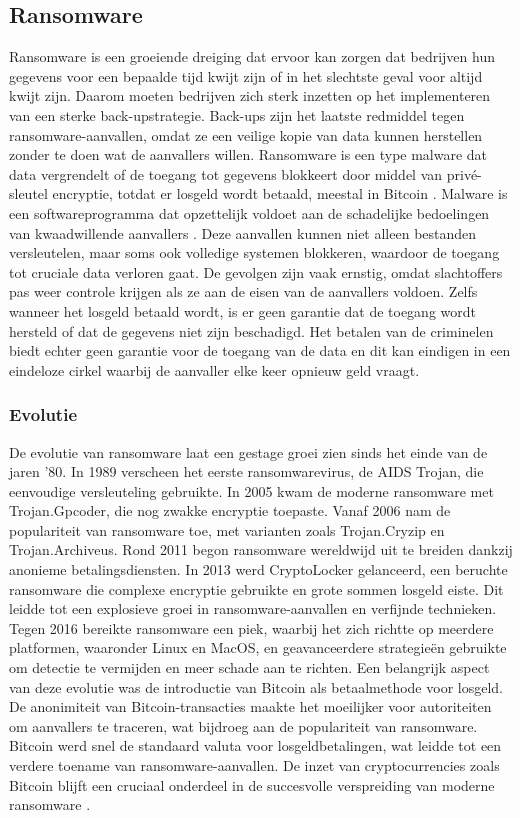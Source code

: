 \subsection{Ransomware}
Ransomware is een groeiende dreiging dat ervoor kan zorgen dat bedrijven hun gegevens voor een bepaalde tijd kwijt zijn of in het slechtste geval voor altijd kwijt zijn. Daarom moeten bedrijven zich sterk inzetten op het implementeren van een sterke back-upstrategie. Back-ups zijn het laatste redmiddel tegen ransomware-aanvallen, omdat ze een veilige kopie van data kunnen herstellen zonder te doen wat de aanvallers willen. Ransomware is een type malware dat data vergrendelt of de toegang tot gegevens blokkeert door middel van privé-sleutel encryptie, totdat er losgeld wordt betaald, meestal in Bitcoin \autocite{Richardson2017}. Malware is een softwareprogramma dat opzettelijk voldoet aan de schadelijke bedoelingen van kwaadwillende aanvallers \autocite{Yanfang2017}. Deze aanvallen kunnen niet alleen bestanden versleutelen, maar soms ook volledige systemen blokkeren, waardoor de toegang tot cruciale data verloren gaat. De gevolgen zijn vaak ernstig, omdat slachtoffers pas weer controle krijgen als ze aan de eisen van de aanvallers voldoen. Zelfs wanneer het losgeld betaald wordt, is er geen garantie dat de toegang wordt hersteld of dat de gegevens niet zijn beschadigd. Het betalen van de criminelen biedt echter geen garantie voor de toegang van de data en dit kan eindigen in een eindeloze cirkel waarbij de aanvaller elke keer opnieuw geld vraagt.

\subsubsection{Evolutie}
De evolutie van ransomware laat een gestage groei zien sinds het einde van de jaren '80. In 1989 verscheen het eerste ransomwarevirus, de AIDS Trojan, die eenvoudige versleuteling gebruikte. In 2005 kwam de moderne ransomware met Trojan.Gpcoder, die nog zwakke encryptie toepaste. Vanaf 2006 nam de populariteit van ransomware toe, met varianten zoals Trojan.Cryzip en Trojan.Archiveus. Rond 2011 begon ransomware wereldwijd uit te breiden dankzij anonieme betalingsdiensten. In 2013 werd CryptoLocker gelanceerd, een beruchte ransomware die complexe encryptie gebruikte en grote sommen losgeld eiste. Dit leidde tot een explosieve groei in ransomware-aanvallen en verfijnde technieken. Tegen 2016 bereikte ransomware een piek, waarbij het zich richtte op meerdere platformen, waaronder Linux en MacOS, en geavanceerdere strategieën gebruikte om detectie te vermijden en meer schade aan te richten. Een belangrijk aspect van deze evolutie was de introductie van Bitcoin als betaalmethode voor losgeld. De anonimiteit van Bitcoin-transacties maakte het moeilijker voor autoriteiten om aanvallers te traceren, wat bijdroeg aan de populariteit van ransomware. Bitcoin werd snel de standaard valuta voor losgeldbetalingen, wat leidde tot een verdere toename van ransomware-aanvallen. De inzet van cryptocurrencies zoals Bitcoin blijft een cruciaal onderdeel in de succesvolle verspreiding van moderne ransomware \autocite{Richardson2017}.

